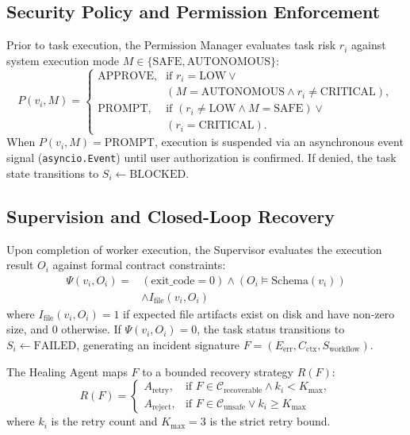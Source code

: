 \documentclass[conference]{IEEEtran}
\begin{document}
\subsection{Security Policy and Permission Enforcement}
Prior to task execution, the Permission Manager evaluates task risk $r_i$ against system execution mode $M \in \{\text{SAFE}, \text{AUTONOMOUS}\}$:
\begin{equation}
P(v_i, M) =
\begin{cases}
\text{APPROVE}, & \text{if } r_i = \text{LOW} \lor {} \\
                & (M = \text{AUTONOMOUS} \land r_i \ne \text{CRITICAL}), \\
\text{PROMPT},  & \text{if } (r_i \ne \text{LOW} \land M = \text{SAFE}) \lor {} \\
                & (r_i = \text{CRITICAL}).
\end{cases}
\end{equation}
When $P(v_i, M) = \text{PROMPT}$, execution is suspended via an asynchronous event signal (\texttt{asyncio.Event}) until user authorization is confirmed. If denied, the task state transitions to $S_i \leftarrow \text{BLOCKED}$.

\subsection{Supervision and Closed-Loop Recovery}
Upon completion of worker execution, the Supervisor evaluates the execution result $O_i$ against formal contract constraints:
\begin{equation}
\begin{aligned}
\Psi(v_i, O_i) = {} & (\text{exit\_code} = 0) \land (O_i \models \text{Schema}(v_i)) \\
                    & \land I_{\text{file}}(v_i, O_i)
\end{aligned}
\end{equation}
where $I_{\text{file}}(v_i, O_i) = 1$ if expected file artifacts exist on disk and have non-zero size, and $0$ otherwise. If $\Psi(v_i, O_i) = 0$, the task status transitions to $S_i \leftarrow \text{FAILED}$, generating an incident signature $F = (E_{\text{err}}, C_{\text{ctx}}, S_{\text{workflow}})$.

The Healing Agent maps $F$ to a bounded recovery strategy $R(F)$:
\begin{equation}
R(F) =
\begin{cases}
A_{\text{retry}}, & \text{if } F \in \mathcal{C}_{\text{recoverable}} \land k_i < K_{\text{max}}, \\
A_{\text{reject}}, & \text{if } F \in \mathcal{C}_{\text{unsafe}} \lor k_i \ge K_{\text{max}}
\end{cases}
\end{equation}
where $k_i$ is the retry count and $K_{\text{max}} = 3$ is the strict retry bound.
\end{document}

